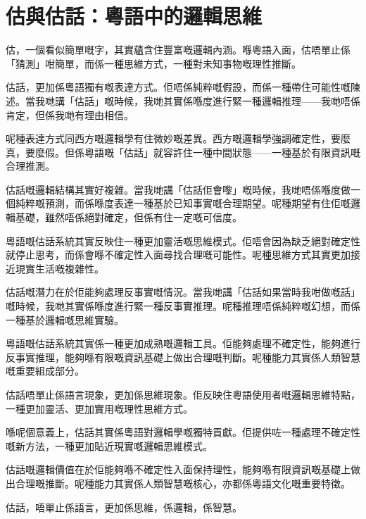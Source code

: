 \chapter{估與估話：粵語中的邏輯思維}

估，一個看似簡單嘅字，其實蘊含住豐富嘅邏輯內涵。喺粵語入面，估唔單止係「猜測」咁簡單，而係一種思維方式，一種對未知事物嘅理性推斷。

估話，更加係粵語獨有嘅表達方式。佢唔係純粹嘅假設，而係一種帶住可能性嘅陳述。當我哋講「估話」嘅時候，我哋其實係喺度進行緊一種邏輯推理——我哋唔係肯定，但係我哋有理由相信。

呢種表達方式同西方嘅邏輯學有住微妙嘅差異。西方嘅邏輯學強調確定性，要麼真，要麼假。但係粵語嘅「估話」就容許住一種中間狀態——一種基於有限資訊嘅合理推測。

估話嘅邏輯結構其實好複雜。當我哋講「估話佢會嚟」嘅時候，我哋唔係喺度做一個純粹嘅預測，而係喺度表達一種基於已知事實嘅合理期望。呢種期望有住佢嘅邏輯基礎，雖然唔係絕對確定，但係有住一定嘅可信度。

粵語嘅估話系統其實反映住一種更加靈活嘅思維模式。佢唔會因為缺乏絕對確定性就停止思考，而係會喺不確定性入面尋找合理嘅可能性。呢種思維方式其實更加接近現實生活嘅複雜性。

估話嘅潛力在於佢能夠處理反事實嘅情況。當我哋講「估話如果當時我咁做嘅話」嘅時候，我哋其實係喺度進行緊一種反事實推理。呢種推理唔係純粹嘅幻想，而係一種基於邏輯嘅思維實驗。

粵語嘅估話系統其實係一種更加成熟嘅邏輯工具。佢能夠處理不確定性，能夠進行反事實推理，能夠喺有限嘅資訊基礎上做出合理嘅判斷。呢種能力其實係人類智慧嘅重要組成部分。

估話唔單止係語言現象，更加係思維現象。佢反映住粵語使用者嘅邏輯思維特點，一種更加靈活、更加實用嘅理性思維方式。

喺呢個意義上，估話其實係粵語對邏輯學嘅獨特貢獻。佢提供咗一種處理不確定性嘅新方法，一種更加貼近現實嘅邏輯思維模式。

估話嘅邏輯價值在於佢能夠喺不確定性入面保持理性，能夠喺有限資訊嘅基礎上做出合理嘅推斷。呢種能力其實係人類智慧嘅核心，亦都係粵語文化嘅重要特徵。

估話，唔單止係語言，更加係思維，係邏輯，係智慧。
